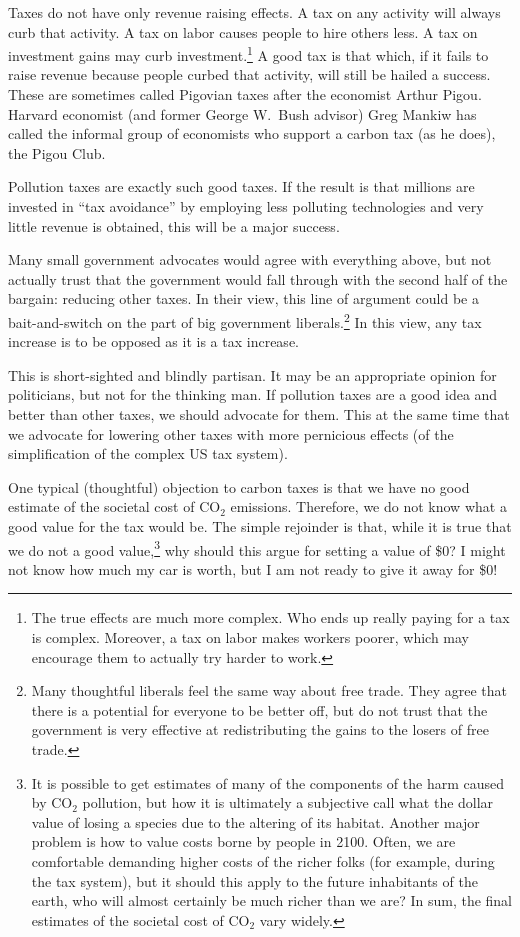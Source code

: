 Taxes do not have only revenue raising effects. A tax on any activity will
always curb that activity. A tax on labor causes people to hire others
less. A tax on investment gains may curb investment.\footnote{The true effects
are much more complex. Who ends up really paying for a tax is complex.
Moreover, a tax on labor makes workers poorer, which may encourage them to
actually try harder to work.} A good tax is that which, if it fails to raise
revenue because people curbed that activity, will still be hailed a success.
These are sometimes called Pigovian taxes after the economist Arthur Pigou.
Harvard economist (and former George W.\ Bush advisor) Greg Mankiw has called
the informal group of economists who support a carbon tax (as he does), the
Pigou Club.

Pollution taxes are exactly such good taxes. If the result is that millions are
invested in ``tax avoidance'' by employing less polluting technologies and very
little revenue is obtained, this will be a major success.

Many small government advocates would agree with everything above, but not
actually trust that the government would fall through with the second half of
the bargain: reducing other taxes. In their view, this line of argument could
be a bait-and-switch on the part of big government liberals.\footnote{Many
thoughtful liberals feel the same way about free trade. They agree that there
is a potential for everyone to be better off, but do not trust that the
government is very effective at redistributing the gains to the losers of free
trade.} In this view, any tax increase is to be opposed as it is a tax
increase.

This is short-sighted and blindly partisan. It may be an appropriate opinion
for politicians, but not for the thinking man. If pollution taxes are a good
idea and better than other taxes, we should advocate for them. This at the same
time that we advocate for lowering other taxes with more pernicious effects (of
the simplification of the complex US tax system).

One typical (thoughtful) objection to carbon taxes is that we have no good
estimate of the societal cost of CO${}_2$ emissions. Therefore, we do not know
what a good value for the tax would be. The simple rejoinder is that, while it
is true that we do not a good value,\footnote{It is possible to get estimates
of many of the components of the harm caused by CO${}_2$ pollution, but how it
is ultimately a subjective call what the dollar value of losing a species due
to the altering of its habitat. Another major problem is how to value costs
borne by people in 2100. Often, we are comfortable demanding higher costs of
the richer folks (for example, during the tax system), but it should this apply
to the future inhabitants of the earth, who will almost certainly be much
richer than we are? In sum, the final estimates of the societal cost of
CO${}_2$ vary widely.} why should this argue for setting a value of \$0? I
might not know how much my car is worth, but I am not ready to give it away for
\$0!

